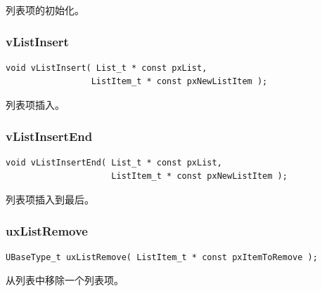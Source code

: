 \documentclass[12pt, a4paper]{article}
\begin{document}
列表项的初始化。

\subsubsection {vListInsert}

\begin{lstlisting}[language={[ANSI]C},keywordstyle=\color{blue!70},commentstyle=\color{red!50!green!50!blue!50},frame=shadowbox, rulesepcolor=\color{red!20!green!20!blue!20}]
void vListInsert( List_t * const pxList, 
                 ListItem_t * const pxNewListItem );
\end{lstlisting}

列表项插入。

\subsubsection {vListInsertEnd}

\begin{lstlisting}[language={[ANSI]C},keywordstyle=\color{blue!70},commentstyle=\color{red!50!green!50!blue!50},frame=shadowbox, rulesepcolor=\color{red!20!green!20!blue!20}]
void vListInsertEnd( List_t * const pxList,
                     ListItem_t * const pxNewListItem );
\end{lstlisting}

列表项插入到最后。

\subsubsection {uxListRemove}

\begin{lstlisting}[language={[ANSI]C},keywordstyle=\color{blue!70},commentstyle=\color{red!50!green!50!blue!50},frame=shadowbox, rulesepcolor=\color{red!20!green!20!blue!20}]
UBaseType_t uxListRemove( ListItem_t * const pxItemToRemove );
\end{lstlisting}

从列表中移除一个列表项。
\end{document}
